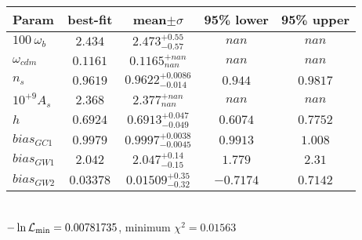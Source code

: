 \begin{tabular}{|l|c|c|c|c|} 
 \hline 
Param & best-fit & mean$\pm\sigma$ & 95\% lower & 95\% upper \\ \hline 
$100~\omega_{b }$ &$2.434$ & $2.473_{-0.57}^{+0.55}$ & $nan$ & $nan$ \\ 
$\omega_{cdm }$ &$0.1161$ & $0.1165_{nan}^{+nan}$ & $nan$ & $nan$ \\ 
$n_{s }$ &$0.9619$ & $0.9622_{-0.014}^{+0.0086}$ & $0.944$ & $0.9817$ \\ 
$10^{+9}A_{s }$ &$2.368$ & $2.377_{nan}^{+nan}$ & $nan$ & $nan$ \\ 
$h$ &$0.6924$ & $0.6913_{-0.049}^{+0.047}$ & $0.6074$ & $0.7752$ \\ 
$bias_{GC 1 }$ &$0.9979$ & $0.9997_{-0.0045}^{+0.0038}$ & $0.9913$ & $1.008$ \\ 
$bias_{GW 1 }$ &$2.042$ & $2.047_{-0.15}^{+0.14}$ & $1.779$ & $2.31$ \\ 
$bias_{GW 2 }$ &$0.03378$ & $0.01509_{-0.32}^{+0.35}$ & $-0.7174$ & $0.7142$ \\ 
\hline 
 \end{tabular} \\ 
$-\ln{\cal L}_\mathrm{min} =0.00781735$, minimum $\chi^2=0.01563$ \\ 

